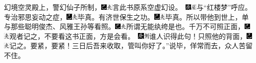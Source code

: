 幻境空灵殿上，警幻仙子所制，{\includegraphics[width=3mm]{../Images/00003}\includegraphics[width=3mm]{../Images/00012}\footnotesize \kaishu 言此书原系空虚幻设。　{\includegraphics[width=3mm]{../Images/00004}\includegraphics[width=3mm]{../Images/00010}\footnotesize \kaishu 与“红楼梦”呼应。}}专治邪思妄动之症，{\includegraphics[width=3mm]{../Images/00003}\includegraphics[width=3mm]{../Images/00012}\footnotesize \kaishu 毕真。}有济世保生之功。{\includegraphics[width=3mm]{../Images/00003}\includegraphics[width=3mm]{../Images/00012}\footnotesize \kaishu 毕真。}所以带他到世上，单与那些聪明俊杰、风雅王孙等看照。{\includegraphics[width=3mm]{../Images/00003}\includegraphics[width=3mm]{../Images/00012}\footnotesize \kaishu 所谓无能纨绔是也。}千万不可照正面，{\includegraphics[width=3mm]{../Images/00003}\includegraphics[width=3mm]{../Images/00012}\footnotesize \kaishu 观者记之，不要看这书正面，方是会看。　{\includegraphics[width=3mm]{../Images/00004}\includegraphics[width=3mm]{../Images/00011}\footnotesize \kaishu 谁人识得此句！}}只照他的背面，{\includegraphics[width=3mm]{../Images/00003}\includegraphics[width=3mm]{../Images/00012}\footnotesize \kaishu 记之。}要紧，要紧！三日后吾来收取，管叫你好了。”说毕，佯常而去，众人苦留不住。

